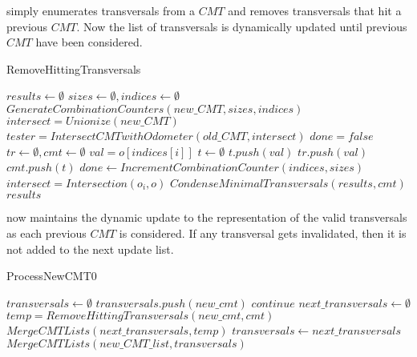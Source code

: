   simply enumerates transversals from a $CMT$ and removes transversals that hit a previous $CMT$. Now the list of transversals is dynamically updated until previous $CMT$ have been considered. 
\begin{algorithm}[H]
    \centering
	\caption{RemoveHittingTransversals}
	\label{RemoveHittingTransversals}
	\begin{algorithmic}[1]
		\State $results \gets \emptyset$
		\State $sizes \gets \emptyset, indices \gets \emptyset$
		\State $GenerateCombinationCounters(new\_CMT,sizes,indices)$
		\State $intersect = Unionize(new\_CMT)$
		\State $tester = IntersectCMTwithOdometer(old\_CMT,intersect)$
		\State $done = false$
		\State $tr \gets \emptyset, cmt \gets \emptyset$
		\State $val = o[indices[i]]$
		\State $t \gets \emptyset$
		\State $t.push(val)$
		\State $tr.push(val)$
		\State $cmt.push(t)$ 
		\EndFor
		\State $done \gets IncrementCombinationCounter(indices,sizes)$
		\State $intersect = Intersection(o_i,o)$
		\State $CondenseMinimalTransversals(results,cmt)$
		\EndIf
		\EndWhile
		\State \Return $results$
		\EndFunction
	\end{algorithmic}
\end{algorithm}

 now maintains the dynamic update to the representation of the valid transversals as each previous $CMT$ is considered. If any transversal gets invalidated, then it is not added to the next update list. 
\begin{algorithm}[H]
    \centering
	\caption{ProcessNewCMT0}
	\label{ProcessNewCMT0}
	\begin{algorithmic}[1]
		\State $transversals \gets \emptyset$
		\State $transversals.push(new\_cmt)$
		\State $continue$
		\EndIf
		\State $next\_transversals \gets \emptyset$
		\State $temp = RemoveHittingTransversals(new\_cmt,cmt)$
		\State $MergeCMTLists(next\_transversals,temp)$
		\EndFor
		\State $transversals \gets next\_transversals$
		\EndFor
		\State $MergeCMTLists(new\_CMT\_list,transversals)$
		\EndFunction
	\end{algorithmic}
\end{algorithm}

